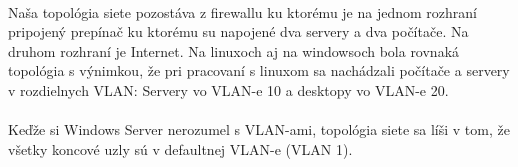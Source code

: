 \paragraph{}
Naša topológia siete pozostáva z firewallu ku ktorému je na jednom rozhraní pripojený prepínač ku ktorému su napojené dva servery a dva počítače. Na druhom rozhraní je Internet. Na linuxoch aj na windowsoch bola rovnaká topológia s výnimkou, že pri pracovaní s linuxom sa nachádzali počítače a servery v rozdielnych VLAN: Servery vo VLAN-e 10 a desktopy vo VLAN-e 20.
\paragraph{}
Keďže si Windows Server nerozumel s VLAN-ami, topológia siete sa líši v tom, že všetky koncové uzly sú v defaultnej VLAN-e (VLAN 1).

